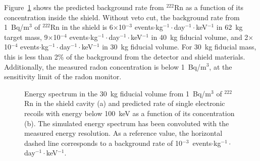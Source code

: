 Figure~\ref{figRadonB} shows the predicted background rate from $^{222}$Rn as a function of its concentration inside the shield. Without veto cut, the background rate from 1~Bq/m$^{3}$ of $^{222}$Rn in the shield is 6$\times$10$^{-3}$ events$\cdot$kg$^{-1}\cdot$day$^{-1}\cdot$keV$^{-1}$ in 62~kg target mass, 9$\times$10$^{-4}$ events$\cdot$kg$^{-1}\cdot$day$^{-1}\cdot$keV$^{-1}$ in 40~kg fiducial volume, and 2$\times$10$^{-4}$ events$\cdot$kg$^{-1}\cdot$day$^{-1}\cdot$keV$^{-1}$ in 30~kg fiducial volume. For 30~kg fiducial mass, this is less than 2\% of the background from the detector and shield materials. Additionally, the measured radon concentration is below 1~Bq/m$^{3}$, at the sensitivity limit of the radon monitor.

\begin{figure}[!h]
\centering
{}
\caption[Energy spectrum from 1~Bq/m$^{3}$ of $^{222}$Rn in the shield cavity and predicted rate of single electronic recoils with energy below 100~keV as a function of its concentration]{Energy spectrum in the 30~kg fiducial volume from 1~Bq/m$^{3}$ of $^{222}$Rn in the shield cavity (a) and predicted rate of single electronic recoils with energy below 100~keV as a function of its concentration (b). The simulated energy spectrum has been convoluted with the measured energy resolution. As a reference value, the horizontal dashed line corresponds to a background rate of 10$^{-3}$~events$\cdot$kg$^{-1}\cdot$day$^{-1}\cdot$keV$^{-1}$.}
\label{figRadonB}
\end{figure}
